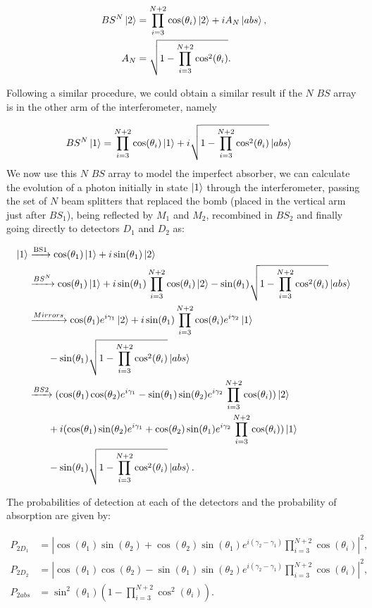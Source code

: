 \documentclass[12pt]{book}
\begin{document}
\begin{align}
BS^{N}\ket{2}&=\prod_{i=3}^{N+2} \cos(\theta_{i})\ket{2}+i A_{N} \ket{abs},\\
A_{N}&=\sqrt{1-\prod_{i=3}^{N+2}\cos^2(\theta_{i})}.
\end{align}

Following a similar procedure, we could obtain a similar result if the $N$ $BS$ array is in the other arm of the interferometer, namely

\begin{align}
BS^{N}\ket{1}&=\prod_{i=3}^{N+2} \cos(\theta_{i})\ket{1}+i \sqrt{1-\prod_{i=3}^{N+2}\cos^2(\theta_{i})} \ket{abs}
\end{align}
 We now use this $N$ $BS$ array to model the imperfect absorber, we can calculate the evolution of a photon initially in state $\ket{1}$ through the interferometer, passing the set of $N$ beam splitters that replaced the bomb (placed in the vertical arm just after $BS_1$), being reflected by $M_1$ and $M_2$, recombined in $BS_2$ and finally going directly to detectors $D_1$ and $D_2$ as: 


\begin{align*}
\ket{1}&\xrightarrow{\text{BS1}}\cos(\theta_{1})\ket{1}+i\sin(\theta_{1})\ket{2}\\ &\xrightarrow{{BS^{N}}}\cos(\theta_{1})\ket{1}+i\sin(\theta_{1})\prod_{i=3}^{N+2} \cos(\theta_{i})\ket{2}-\sin(\theta_{1})\sqrt{1-\prod_{i=3}^{N+2}\cos^2(\theta_{i})}\ket{abs} \\ & \xrightarrow{{Mirrors}}\cos(\theta_{1})  e^{i \gamma_{1}}\ket{2}+i\sin(\theta_{1})\prod_{i=3}^{N+2} \cos(\theta_{i}) e^{i \gamma_{2}}\ket{1}\\
& \qquad -\sin(\theta_{1})\sqrt{1-\prod_{i=3}^{N+2}\cos^2(\theta_{i})}\ket{abs} \\ & \xrightarrow{{BS2}}(\cos(\theta_{1})\cos(\theta_{2})e^{i \gamma_{1}}-\sin(\theta_{1})\sin(\theta_{2})e^{i \gamma_{2}}\prod_{i=3}^{N+2} \cos(\theta_{i}))\ket{2}\\ & \qquad + i(\cos(\theta_{1})\sin(\theta_{2})e^{i \gamma_{1}}+\cos(\theta_{2})\sin(\theta_{1})e^{i \gamma_{2}}\prod_{i=3}^{N+2} \cos(\theta_{i}))\ket{1}\\ & \qquad -\sin(\theta_{1})\sqrt{1-\prod_{i=3}^{N+2}\cos^2(\theta_{i})}\ket{abs}.
\end{align*}
 
The probabilities of detection at each of the detectors and the probability of absorption are given by:

\begin{align}
P_{2D_{1}}&=|\cos(\theta_{1})\sin(\theta_{2})+\cos(\theta_{2})\sin(\theta_{1})e^{i (\gamma_{2}-\gamma_{1})}\prod_{i=3}^{N+2} \cos(\theta_{i})|^2,\\
P_{2D_{2}}&=|\cos(\theta_{1})\cos(\theta_{2})-\sin(\theta_{1})\sin(\theta_{2})e^{i (\gamma_{2}-\gamma_{1})}\prod_{i=3}^{N+2} \cos(\theta_{i})|^2,\\
P_{2abs}&=\sin^2(\theta_{1})\left(1-\prod_{i=3}^{N+2}\cos^2(\theta_{i})\right).
\end{align}
\end{document}
